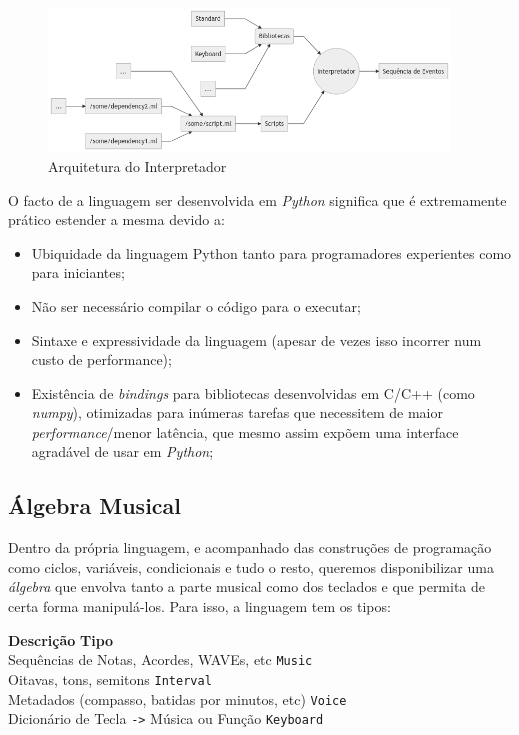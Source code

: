 \begin{figure}[h]
\begin{center}
    \includegraphics[width=0.95\textwidth]{img/diagram_virtualmachine.png}
\end{center}
\caption{Arquitetura do Interpretador}
\end{figure}
O facto de a linguagem ser desenvolvida em \textit{Python} significa que é extremamente prático estender a mesma devido a:
\begin{itemize}
    \item Ubiquidade da linguagem Python tanto para programadores experientes como para iniciantes;
    \item Não ser necessário compilar o código para o executar;
    \item Sintaxe e expressividade da linguagem (apesar de vezes isso incorrer num custo de performance);
    \item Existência de \textit{bindings} para bibliotecas desenvolvidas em C/C++ (como \textit{numpy}), otimizadas para inúmeras tarefas que necessitem de maior \textit{performance}/menor latência, que mesmo assim expõem uma interface agradável de usar em \textit{Python};
\end{itemize}

\subsection{Álgebra Musical}
Dentro da própria linguagem, e acompanhado das construções de programação como ciclos, variáveis, condicionais e tudo o resto, queremos disponibilizar uma \textit{álgebra} que envolva tanto a parte musical como dos teclados e que permita de certa forma manipulá-los. Para isso, a linguagem tem os tipos:

\medskip
\noindent
\textbf{Descrição}  \hfill  \textbf{Tipo} \ \  \\
Sequências de Notas, Acordes, WAVEs, etc \dotfill  \texttt{Music}  \\
Oitavas, tons, semitons \dotfill  \texttt{Interval} \\
Metadados (compasso, batidas por minutos, etc) \dotfill  \texttt{Voice} \\
Dicionário de Tecla \texttt{->} Música ou Função \dotfill  \texttt{Keyboard} 

